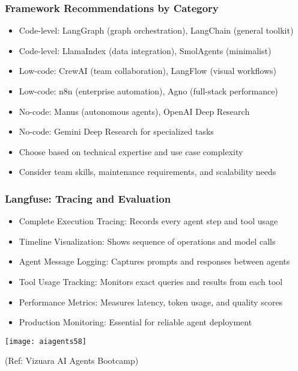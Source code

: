 \begin{frame}[fragile]\frametitle{Framework Recommendations by Category}
      \begin{itemize}
	  \item Code-level: LangGraph (graph orchestration), LangChain (general toolkit)
	  \item Code-level: LlamaIndex (data integration), SmolAgents (minimalist)
	  \item Low-code: CrewAI (team collaboration), LangFlow (visual workflows)
	  \item Low-code: n8n (enterprise automation), Agno (full-stack performance)
	  \item No-code: Manus (autonomous agents), OpenAI Deep Research
	  \item No-code: Gemini Deep Research for specialized tasks
	  \item Choose based on technical expertise and use case complexity
	  \item Consider team skills, maintenance requirements, and scalability needs
	  \end{itemize}
\end{frame}


\begin{frame}[fragile]\frametitle{Langfuse: Tracing and Evaluation}
      \begin{itemize}
		\item Complete Execution Tracing: Records every agent step and tool usage
		\item Timeline Visualization: Shows sequence of operations and model calls
		\item Agent Message Logging: Captures prompts and responses between agents
		\item Tool Usage Tracking: Monitors exact queries and results from each tool
		\item Performance Metrics: Measures latency, token usage, and quality scores
		\item Production Monitoring: Essential for reliable agent deployment
	  \end{itemize}
		\begin{center}
		\texttt{[image: aiagents58]}
		
		{\tiny (Ref: Vizuara AI Agents Bootcamp)}
		\end{center}	
\end{frame}


